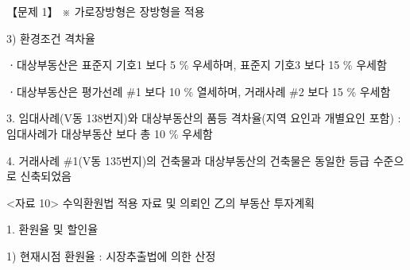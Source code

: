 \begin{longquestion}{【문제 1】}
※ 가로장방형은 장방형을 적용 \par
3) 환경조건 격차율 \par
ㆍ대상부동산은 표준지 기호1 보다 5 \% 우세하며, 표준지 기호3 보다 15 \% 우세함 \par
ㆍ대상부동산은 평가선례 \#1 보다 10 \% 열세하며, 거래사례 \#2 보다 15 \% 우세함 \par
3. 임대사례(V동 138번지)와 대상부동산의 품등 격차율(지역 요인과 개별요인 포함) : 임대사례가 대상부동산 보다 총 10 \% 우세함 \par
4. 거래사례 \#1(V동 135번지)의 건축물과 대상부동산의 건축물은 동일한 등급 수준으로 신축되었음 \par
<자료 10> 수익환원법 적용 자료 및 의뢰인 乙의 부동산 투자계획 \par
1. 환원율 및 할인율 \par
1) 현재시점 환원율 : 시장추출법에 의한 산정 \par
{\small\centering
{}\par}


\end{longquestion}
